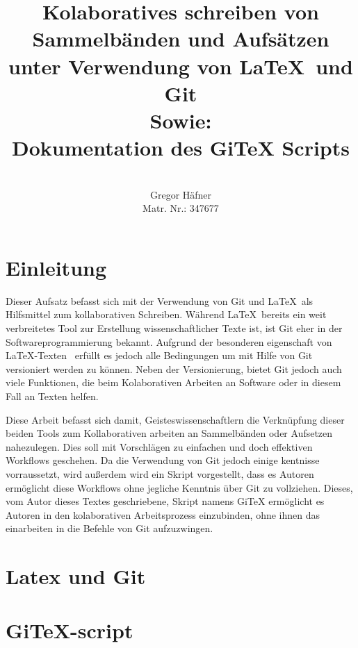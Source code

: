 \documentclass[12pt,a4paper]{scrartcl}
\author{\\ Gregor Häfner \\
{\small Matr. Nr.: 347677} }
\title{Kolaboratives schreiben von Sammelbänden und Aufsätzen unter Verwendung von \LaTeX ~und Git \bigskip \\ Sowie: \\ Dokumentation des GiTeX Scripts}
\begin{document}
\maketitle
\bigskip
\tableofcontents
\pagebreak

\section{Einleitung}

Dieser Aufsatz befasst sich mit der Verwendung von Git und \LaTeX \ als Hilfsmittel zum kollaborativen Schreiben. Während \LaTeX \ bereits ein weit verbreitetes Tool zur Erstellung wissenschaftlicher Texte ist, ist Git eher in der Softwareprogrammierung bekannt. Aufgrund der besonderen eigenschaft von \LaTeX -Texten \ erfüllt es jedoch alle Bedingungen um mit Hilfe von Git versioniert werden zu können. Neben der Versionierung, bietet Git jedoch auch viele Funktionen, die beim Kolaborativen Arbeiten an Software oder in diesem Fall an Texten helfen.

 Diese Arbeit befasst sich damit, Geisteswissenschaftlern die Verknüpfung dieser beiden Tools zum Kollaborativen arbeiten an Sammelbänden oder Aufsetzen nahezulegen. Dies soll mit Vorschlägen zu einfachen und doch effektiven Workflows geschehen. Da die Verwendung von Git jedoch einige kentnisse vorraussetzt, wird außerdem wird ein Skript vorgestellt, dass es Autoren ermöglicht diese Workflows ohne jegliche Kenntnis über Git zu vollziehen. Dieses, vom Autor dieses Textes geschriebene, Skript namens GiTeX ermöglicht es Autoren in den kolaborativen Arbeitsprozess einzubinden, ohne ihnen das einarbeiten in die Befehle von Git aufzuzwingen.

\section{Latex und Git}



\section{GiTeX-script}
\end{document}
